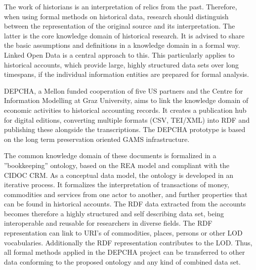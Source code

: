 \documentclass[12pt,a4paper]{article}
\begin{document}
The work of historians is an interpretation of relics from the past. Therefore, when using formal methods on historical data, research should distinguish between the representation of the original source and its interpretation. The latter is the core knowledge domain of historical research. It is advised to share the basic assumptions and definitions in a knowledge domain in a formal way. Linked Open Data is a central approach to this. This particularly applies to historical accounts, which provide large, highly structured data sets over long timespans, if the individual information entities are prepared for formal analysis.

DEPCHA, a Mellon funded cooperation of five US partners and the Centre for Information Modelling at Graz University, aims to link the knowledge domain of economic activities to historical accounting records. It creates a publication hub for digital editions, converting multiple formats (CSV, TEI/XML) into RDF and publishing these alongside the transcriptions. The DEPCHA prototype is based on the long term preservation oriented GAMS infrastructure.

The common knowledge domain of these documents is formalized in a ”bookkeeping” ontology, based on the REA model and compliant with the CIDOC CRM. As a conceptual data model, the ontology is developed in an iterative process. It formalizes the interpretation of transactions of money, commodities and services from one actor to another, and further properties that can be found in historical accounts. The RDF data extracted from the accounts becomes therefore a highly structured and self describing data set, being interoperable and reusable for researchers in diverse fields. The RDF representation can link to URI’s of commodities, places, persons or other LOD vocabularies. Additionally the RDF representation contributes to the LOD. Thus, all formal methods applied in the DEPCHA project can be transferred to other data conforming to the proposed ontology and any kind of combined data set.



\newpage
\nocite{*}


\newpage
\end{document}
